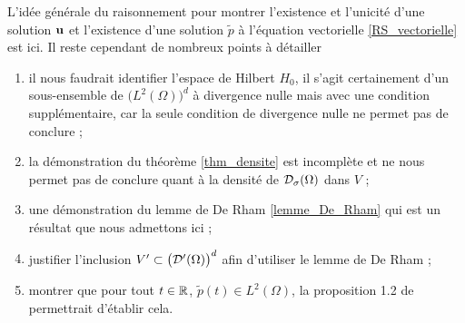 \begin{remark}
    L'idée générale du raisonnement pour montrer l'existence et l'unicité d'une solution $\bm{\mathrm{u}}$ et l'existence d'une solution $\tilde{p}$ à l'équation vectorielle \eqref{RS_vectorielle} est ici. Il reste cependant de nombreux points à détailler
    \begin{enumerate}
        \item il nous faudrait identifier l'espace de Hilbert $H_0$, il s'agit certainement d'un sous-ensemble de $\big(L^2(\Omega)\big)^d$ à divergence nulle mais avec une condition supplémentaire, car la seule condition de divergence nulle ne permet pas de conclure ;
        \item la démonstration du théorème \ref{thm_densite} est incomplète et ne nous permet pas de conclure quant à la densité de $\mathcal{D}_{\sigma}(\Omega)$ dans $V$ ;
        \item une démonstration du lemme de De Rham \ref{lemme_De_Rham} qui est un résultat que nous admettons ici ;
        \item justifier l'inclusion $V' \subset \big(\mathcal{D}'(\Omega)\big)^d$ afin d'utiliser le lemme de De Rham ;
        \item montrer que pour tout $t \in \mathbb{R}$, $\tilde{p}(t) \in L^2(\Omega)$, la proposition 1.2 de \cite{Temam1977} permettrait d'établir cela.
    \end{enumerate}
\end{remark}


\newpage